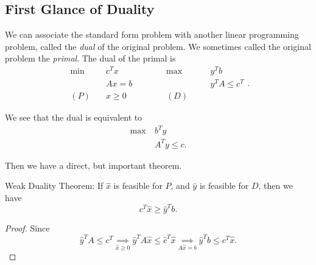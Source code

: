 \subsection{First Glance of Duality}
We can associate the standard form problem with another linear programming problem, called the \emph{dual} of the original problem.
We sometimes called the original problem the \emph{primal}. The dual of the primal is
\[
	\begin{alignedat}{5}
		\min~&c^{T}x\qquad\qquad &&\max ~ &&y^{T}b\\
		&Ax = b && &&y^{T}A\leq c^{T}\\
		(P)\quad&x\geq  0 &&(D)\quad&&
	\end{alignedat}.
\]

\begin{note}
	We see that the dual is equivalent to
	\begin{align*}
		\max~ & b^{T}y         \\
		      & A^{T}y \leq c.
	\end{align*}
\end{note}

Then we have a direct, but important theorem.
\begin{theorem}\label{Weak Duality Theorem}
	Weak Duality Theorem: If \(\hat{x}\) is feasible for \(P\), and \(\hat{y}\) is feasible for \(D\), then we have
	\[
		c^{T}\hat{x} \geq  \hat{y}^{T} b.
	\]
\end{theorem}
\begin{proof}
	Since
	\[
		\hat{y}^{T}A\leq c^{T} \underset{\hat{x}\geq 0}{\implies} \hat{y}^{T}A \hat{x} \leq \hat{c}^{T} \hat{x} \underset{A \hat{x} = b}{\implies} \hat{y}^{T}b \leq c^{T} \hat{x}.
	\]
\end{proof}

